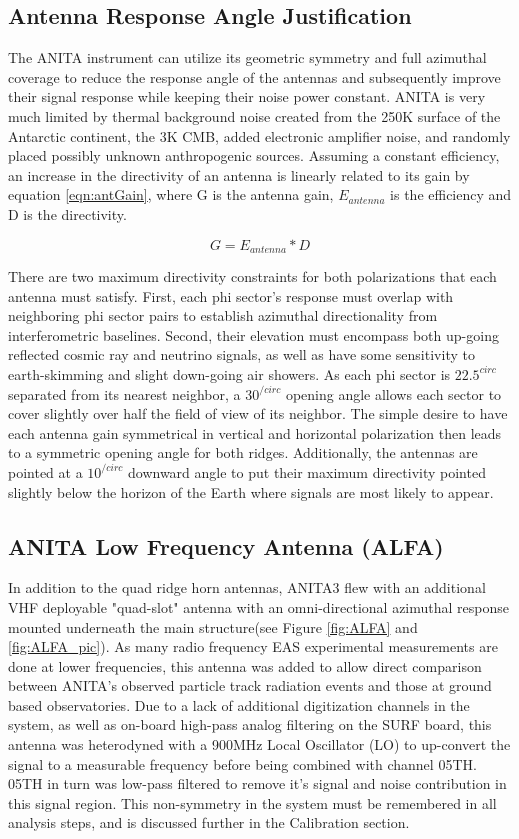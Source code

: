 	\subsection{Antenna Response Angle Justification}
		The ANITA instrument can utilize its geometric symmetry and full azimuthal coverage to reduce the response angle of the antennas and subsequently improve their signal response while keeping their noise power constant.  ANITA is very much limited by thermal background noise created from the 250K surface of the Antarctic continent, the 3K CMB, added electronic amplifier noise, and randomly placed possibly unknown anthropogenic sources.  Assuming a constant efficiency, an increase in the directivity of an antenna is linearly related to its gain by equation \ref{eqn:antGain}, where G is the antenna gain, $E_{antenna}$ is the efficiency and D is the directivity.
		
\begin{equation}
	\label{eqn:antGain}
	G = E_{antenna} * D
\end{equation}
		
		There are two maximum directivity constraints for both polarizations that each antenna must satisfy.  First, each phi sector's response must overlap with neighboring phi sector pairs to establish azimuthal directionality from interferometric baselines. Second, their elevation must encompass both up-going reflected cosmic ray and neutrino signals, as well as have some sensitivity to earth-skimming and slight down-going air showers.  As each phi sector is $22.5^{circ}$ separated from its nearest neighbor, a $30^{/circ}$ opening angle allows each sector to cover slightly over half the field of view of its neighbor.  The simple desire to have each antenna gain symmetrical in vertical and horizontal polarization then leads to a symmetric opening angle for both ridges.   Additionally, the antennas are pointed at a $10^{/circ}$ downward angle to put their maximum directivity pointed slightly below the horizon of the Earth where signals are most likely to appear.  
	
	\subsection{ANITA Low Frequency Antenna (ALFA)}
		In addition to the quad ridge horn antennas, ANITA3 flew with an additional VHF deployable "quad-slot" antenna with an omni-directional azimuthal response mounted underneath the main structure(see Figure \ref{fig:ALFA} and \ref{fig:ALFA_pic}).  As many radio frequency EAS experimental measurements are done at lower frequencies, this antenna was added to allow direct comparison between ANITA's observed particle track radiation events and those at ground based observatories.  Due to a lack of additional digitization channels in the system, as well as on-board high-pass analog filtering on the SURF board, this antenna was heterodyned with a 900MHz Local Oscillator (LO) to up-convert the signal to a measurable frequency before being combined with channel 05TH.  05TH in turn was low-pass filtered to remove it's signal and noise contribution in this signal region.  This non-symmetry in the system must be remembered in all analysis steps, and is discussed further in the Calibration section.
		
